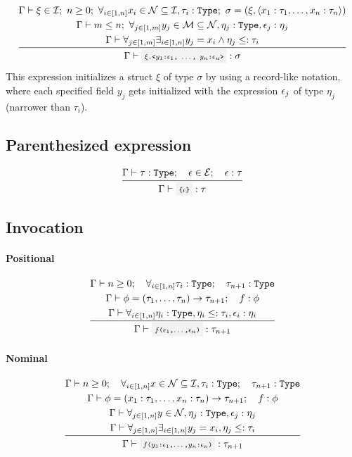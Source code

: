 \[
	\infrule{
		\EnvSym\then \xi \in \Id \semi n \geq 0 \semi \forall_{i\in[1,n]}{x_i\in\mathcal{N}\subseteq\Id, \tau_i:\Type} \semi \sigma = (\xi, \tuple{x_1:\tau_1,\dotsc,x_n:\tau_n}) \\*
		\EnvSym\then m \leq n \semi \forall_{j\in[1,m]}{y_j\in\mathcal{M}\subseteq\mathcal{N}, \eta_j:\Type, \expr_j:\eta_j} \\*
		\EnvSym\then \forall_{j\in[1,m]}{\exists_{i\in[1,n]}{y_j=x_i \land \eta_j\narreq\tau_i}}
	}{
		\EnvSym\then \code{$\xi$.<$y_1$:$\expr_1$, $\dotsc$, $y_n$:$\expr_n$>} : \sigma \\*
	}
\]
This expression initializes a struct $\xi$ of type $\sigma$ by using a
record-like notation, where each specified field $y_j$ gets initialized with the
expression $\epsilon_j$ of type $\eta_j$ (narrower than $\tau_i$).

\clearpage

\subsection{Parenthesized expression}

\[
	\infrule{
		\EnvSym\then \tau:\Type \semiq \expr\in\Expr \semiq \expr:\tau
	}{
		\EnvSym\then \code{\{$\expr$\}} : \tau
	}
\]

\subsection{Invocation}

\paragraph{Positional}

\[
	\infrule{
		\EnvSym\then n \geq 0 \semiq \forall_{i\in[1,n]}{\tau_i:\Type} \semiq \tau_{n+1}:\Type \\*
		\EnvSym\then \phi = (\tau_1,\dotsc,\tau_n)\to\tau_{n+1} \semiq  f : \phi \\*
		\EnvSym\then \forall_{i\in[1,n]}{\eta_i:\Type,\eta_i\narreq\tau_i,\expr_i:\eta_i}
	}{
		\EnvSym\then \code{$f$($\expr_1$,$\dotsc$,$\expr_n$)} : \tau_{n+1}
	}
\]

\paragraph{Nominal}

\[
	\infrule{
		\EnvSym\then n \geq 0 \semiq \forall_{i\in[1,n]}{x\in\mathcal{N}\subseteq\Id,\tau_i:\Type} \semiq \tau_{n+1}:\Type \\*
		\EnvSym\then \phi = (x_1:\tau_1,\dotsc,x_n:\tau_n)\to\tau_{n+1} \semiq  f : \phi \\*
		\EnvSym\then \forall_{j\in[1,n]}{y\in\mathcal{N},\eta_j:\Type,\expr_j:\eta_j} \\*
		\EnvSym\then \forall_{j\in[1,n]}{\exists_{i\in[1,n]}{y_j=x_i,\eta_j\narreq\tau_i}}
	}{
		\EnvSym\then \code{$f$($y_1$:$\expr_1$,$\dotsc$,$y_n$:$\expr_n$)} : \tau_{n+1}
	}
\]

